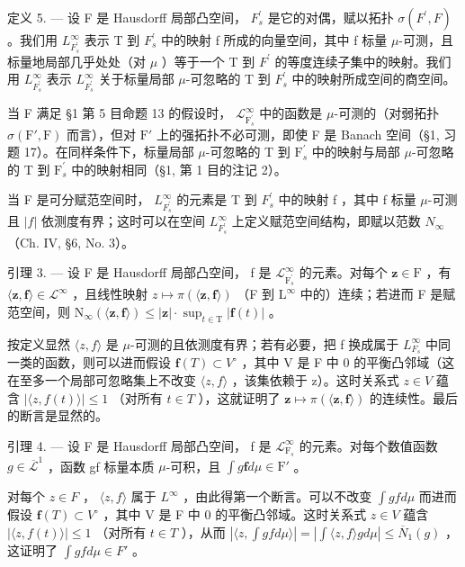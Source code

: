 定义 5. --- 设 F 是 Hausdorff 局部凸空间， \(F_{s}^{\prime}\) 是它的对偶，赋以拓扑 \(\sigma(F^{\prime},F)\) 。我们用 \(L_{F_{s}^{\prime}}^{\infty}\) 表示 T 到 \(F_{s}^{\prime}\) 中的映射 f 所成的向量空间，其中 f 标量 \(\mu\)-可测，且标量地局部几乎处处（对 \(\mu\) ）等于一个 T 到 \(F^{\prime}\) 的等度连续子集中的映射。我们用 \(L_{F_{s}^{\prime}}^{\infty}\) 表示 \(L_{F_{s}^{\prime}}^{\infty}\) 关于标量局部 \(\mu\)-可忽略的 T 到 \(F_{s}^{\prime}\) 中的映射所成空间的商空间。

当 F 满足 §1 第 5 目命题 13 的假设时， \(\mathcal{L}_{\mathrm{F}_s^\prime}^\infty\) 中的函数是 \(\mu\)-可测的（对弱拓扑 \(\sigma(\mathrm{F}',\mathrm{F})\) 而言），但对 \(\mathrm{F}'\) 上的强拓扑不必可测，即使 F 是 Banach 空间（§1, 习题 17）。在同样条件下，标量局部 \(\mu\)-可忽略的 T 到 \(\mathrm{F}_s^\prime\) 中的映射与局部 \(\mu\)-可忽略的 T 到 \(\mathrm{F}_s^\prime\) 中的映射相同（§1, 第 1 目的注记 2）。

当 F 是可分赋范空间时， \(L_{F_{s}^{\prime}}^{\infty}\) 的元素是 T 到 \(F_{s}^{\prime}\) 中的映射 f ，其中 f 标量 \(\mu\)-可测且 \(|f|\) 依测度有界；这时可以在空间 \(L_{F_{s}^{\prime}}^{\infty}\) 上定义赋范空间结构，即赋以范数 \(N_{\infty}\) （Ch. IV, §6, No. 3）。

引理 3. --- 设 F 是 Hausdorff 局部凸空间， f 是 \(\mathcal{L}_{\mathrm{F}_s^\prime}^\infty\) 的元素。对每个 \(\mathbf{z} \in \mathrm{F}\) ，有 \(\langle \mathbf{z}, \mathbf{f} \rangle \in \mathcal{L}^\infty\) ，且线性映射 \(z \mapsto \pi(\langle \mathbf{z}, \mathbf{f} \rangle)\) （F 到 \(\mathrm{L}^\infty\) 中的）连续；若进而 F 是赋范空间，则 \(\mathrm{N}_\infty(\langle \mathbf{z}, \mathbf{f} \rangle) \leqslant |\mathbf{z}| \cdot \sup_{t \in \mathrm{T}} |\mathbf{f}(t)|\) 。

按定义显然 \(\langle z,f\rangle\) 是 \(\mu\)-可测的且依测度有界；若有必要，把 f 换成属于 \(L_{F_{s}}^{\infty}\) 中同一类的函数，则可以进而假设 \(\mathbf{f}(T)\subset V^{\circ}\) ，其中 V 是 F 中 0 的平衡凸邻域（这在至多一个局部可忽略集上不改变 \(\langle z,f\rangle\) ，该集依赖于 z）。这时关系式 \(z\in V\) 蕴含 \(|\langle z,f(t)\rangle|\leqslant1\) （对所有 \(t\in T\) ），这就证明了 \(\mathbf{z}\mapsto\pi(\langle\mathbf{z},\mathbf{f}\rangle)\) 的连续性。最后的断言是显然的。

引理 4. --- 设 F 是 Hausdorff 局部凸空间， f 是 \(\mathcal{L}_{\mathrm{F}_s}^\infty\) 的元素。对每个数值函数 \(g \in \overline{\mathcal{L}}^1\) ，函数 gf 标量本质 \(\mu\)-可积，且 \(\int g\mathbf{f} d\mu \in \mathrm{F}'\) 。

对每个 \(z \in F\) ， \(\langle z, f \rangle\) 属于 \(L^{\infty}\) ，由此得第一个断言。可以不改变 \(\int g f d\mu\) 而进而假设 \(\mathbf{f}(T) \subset V^{\circ}\) ，其中 V 是 F 中 0 的平衡凸邻域。这时关系式 \(z \in V\) 蕴含 \(|\langle z, f(t) \rangle| \leqslant 1\) （对所有 \(t \in T\) ），从而 \(|\langle z, \int g f d\mu \rangle| = |\int \langle z, f \rangle g d\mu| \leqslant \overline{N}_{1}(g)\) ，这证明了 \(\int g f d\mu \in F'\) 。

